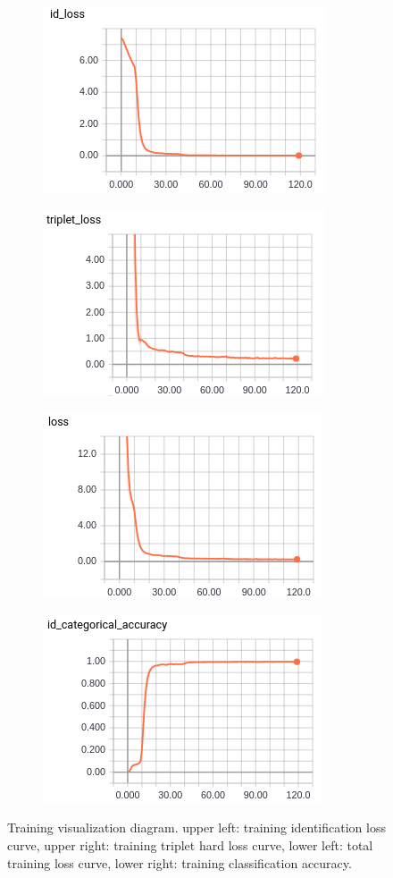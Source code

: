 \begin{figure}
    \begin{subfigure}
        \centering
        \includegraphics[width=.5\linewidth]{figures/train_id_loss.png}
    \end{subfigure}
    \begin{subfigure}
        \centering
        \includegraphics[width=.5\linewidth]{figures/train_triplet_loss.png}
    \end{subfigure}
    \begin{subfigure}
        \centering
        \includegraphics[width=.5\linewidth]{figures/train_loss.png}
    \end{subfigure}
    \begin{subfigure}
        \centering
        \includegraphics[width=.5\linewidth]{figures/train_acc.png}
    \end{subfigure}
    \caption[Training visualization diagram]
    {Training visualization diagram. upper left: training identification loss
        curve, upper right: training triplet hard loss curve, lower left: total
        training loss curve, lower right: training classification accuracy.}
    \label{fig:fw-training}
\end{figure}

